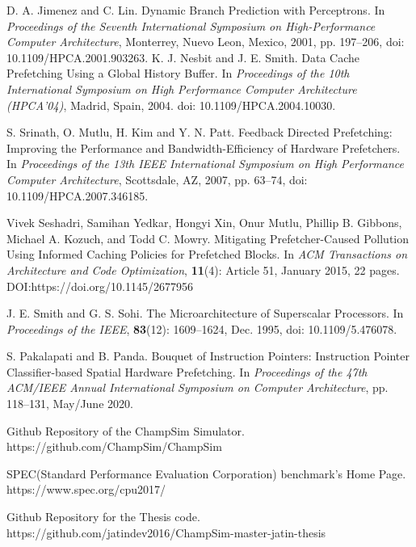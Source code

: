 \begin{thebibliography}{5}
D. A. Jimenez and C. Lin. Dynamic Branch Prediction with Perceptrons. In {\it Proceedings of the Seventh International Symposium on High-Performance Computer Architecture\/}, Monterrey, Nuevo Leon, Mexico, 2001, pp. 197--206, doi: 10.1109/HPCA.2001.903263.
K. J. Nesbit and J. E. Smith. Data Cache Prefetching Using a Global History Buffer. In {\it Proceedings of the 10th International Symposium on High Performance Computer Architecture (HPCA'04)\/}, Madrid, Spain, 2004. doi: 10.1109/HPCA.2004.10030.

S. Srinath, O. Mutlu, H. Kim and Y. N. Patt. Feedback Directed Prefetching: Improving the Performance and Bandwidth-Efficiency of Hardware Prefetchers. In {\it Proceedings of the 13th IEEE International Symposium on High Performance Computer Architecture\/}, Scottsdale, AZ, 2007, pp. 63--74, doi: 10.1109/HPCA.2007.346185.

Vivek Seshadri, Samihan Yedkar, Hongyi Xin, Onur Mutlu, Phillip B. Gibbons, Michael A. Kozuch, and Todd C. Mowry. Mitigating Prefetcher-Caused Pollution Using Informed Caching Policies for Prefetched Blocks. In {\it ACM Transactions on Architecture and Code Optimization\/}, {\bf 11}(4): Article 51, January 2015, 22 pages. DOI:https://doi.org/10.1145/2677956

J. E. Smith and G. S. Sohi. The Microarchitecture of Superscalar Processors. In {\it Proceedings of the IEEE\/}, {\bf 83}(12): 1609--1624, Dec. 1995, doi: 10.1109/5.476078.

S. Pakalapati and B. Panda. Bouquet of Instruction Pointers: Instruction Pointer Classifier-based Spatial Hardware Prefetching.
In {\it Proceedings of the 47th ACM/IEEE Annual International Symposium on Computer Architecture\/}, pp. 118--131, May/June 2020.

Github Repository of the ChampSim Simulator.  https://github.com/ChampSim/ChampSim

SPEC(Standard Performance Evaluation Corporation) benchmark's Home Page. https://www.spec.org/cpu2017/

 Github Repository for the Thesis code.   https://github.com/jatindev2016/ChampSim-master-jatin-thesis

\end{thebibliography}